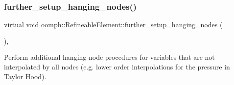 \subsubsection{\texorpdfstring{further\+\_\+setup\+\_\+hanging\+\_\+nodes()}{further\_setup\_hanging\_nodes()}}
{\footnotesize\ttfamily virtual void oomph\+::\+Refineable\+Element\+::further\+\_\+setup\+\_\+hanging\+\_\+nodes (\begin{DoxyParamCaption}{ }\end{DoxyParamCaption})\hspace{0.3cm}{\ttfamily [inline]}, {\ttfamily [virtual]}}



Perform additional hanging node procedures for variables that are not interpolated by all nodes (e.\+g. lower order interpolations for the pressure in Taylor Hood). 



